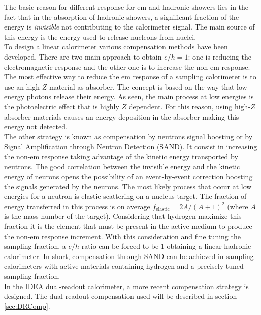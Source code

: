 The basic reason for different response for em and hadronic showers lies in the fact that in the absorption of hadronic showers, a significant fraction of the energy is \textit{invisible} not contributing to the calorimeter signal. The main source of this energy is the energy used to release nucleons from nuclei.\\
To design a linear calorimeter various compensation methods have been developed. There are two main approach to obtain $e/h = 1$: one is reducing the electromagnetic response and the other one is to increase the non-em response.\\
The most effective way to reduce the em response of a sampling calorimeter is to use an high-$Z$ material as absorber. The concept is based on the way that low energy photons release their energy. As seen, the main process at low energies is the photoelectric effect that is highly $Z$ dependent. For this reason, using high-$Z$ absorber materials causes an energy deposition in the absorber making this energy not detected.\\
The other strategy is known as compensation by neutrons signal boosting or by Signal Amplification through Neutron Detection (SAND). It consist in increasing the non-em response taking advantage of the kinetic energy transported by neutrons. The good correlation between the invisible energy and the kinetic energy of neurons opens the possibility of an event-by-event correction boosting the signals generated by the neurons. The most likely process that occur at low energies for a neutron is elastic scattering on a nucleus target. The fraction of energy transferred in this process is on average $f_{\text{elastic}} = 2A / (A +1)^2$ (where $A$ is the mass number of the target). Considering that hydrogen maximize this fraction it is the element that must be present in the active medium to produce the non-em response increment. With this consideration and fine tuning the sampling fraction, a $e/h$ ratio can be forced to be $1$ obtaining a linear hadronic calorimeter.
In short, compensation through SAND can be achieved in sampling calorimeters with active materials containing hydrogen and a precisely tuned sampling fraction.\\
In the IDEA dual-readout calorimeter, a more recent compensation strategy is designed. The dual-readout compensation used will be described in section \ref{sec:DRComp}.

